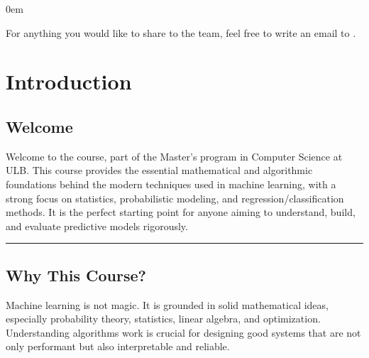 \documentclass[letterpaper,10pt,english]{jupyterBook}
\begin{document}
\begin{DUlineblock}{0em}
\item[] 
\end{DUlineblock}

\sphinxAtStartPar
For anything you would like to share to the team, feel free to write an e\sphinxhyphen{}mail to .

\sphinxstepscope


\chapter{Introduction}
\label{\detokenize{introduction:introduction}}\label{\detokenize{introduction::doc}}

\section{Welcome}
\label{\detokenize{introduction:welcome}}
\sphinxAtStartPar
Welcome to the  course, part of the Master’s program in Computer Science at ULB. This course provides the essential mathematical and algorithmic foundations behind the modern techniques used in machine learning, with a strong focus on statistics, probabilistic modeling, and regression/classification methods. It is the perfect starting point for anyone aiming to understand, build, and evaluate predictive models rigorously.


\bigskip\hrule\bigskip



\section{Why This Course?}
\label{\detokenize{introduction:why-this-course}}
\sphinxAtStartPar
Machine learning is not magic. It is grounded in solid mathematical ideas, especially probability theory, statistics, linear algebra, and optimization. Understanding  algorithms work is crucial for designing good systems that are not only performant but also interpretable and reliable.
\end{document}
